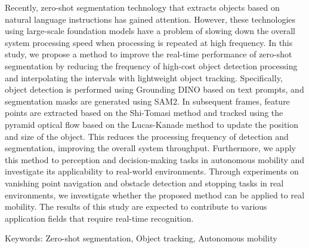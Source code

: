 Recently, zero-shot segmentation technology that extracts objects based on natural language instructions has gained attention. However, these technologies using large-scale foundation models have a problem of slowing down the overall system processing speed when processing is repeated at high frequency. In this study, we propose a method to improve the real-time performance of zero-shot segmentation by reducing the frequency of high-cost object detection processing and interpolating the intervals with lightweight object tracking. Specifically, object detection is performed using Grounding DINO based on text prompts, and segmentation masks are generated using SAM2. In subsequent frames, feature points are extracted based on the Shi-Tomasi method and tracked using the pyramid optical flow based on the Lucas-Kanade method to update the position and size of the object. This reduces the processing frequency of detection and segmentation, improving the overall system throughput. Furthermore, we apply this method to perception and decision-making tasks in autonomous mobility and investigate its applicability to real-world environments. Through experiments on vanishing point navigation and obstacle detection and stopping tasks in real environments, we investigate whether the proposed method can be applied to real mobility. The results of this study are expected to contribute to various application fields that require real-time recognition.


Keywords: Zero-shot segmentation, Object tracking, Autonomous mobility
%